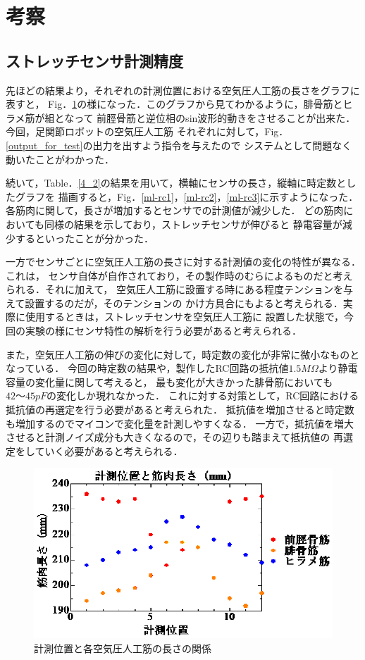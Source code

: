 \section{考察}
\subsection{ストレッチセンサ計測精度}
先ほどの結果より，それぞれの計測位置における空気圧人工筋の長さをグラフに表すと，
Fig．\ref{4-ml}の様になった．このグラフから見てわかるように，腓骨筋とヒラメ筋が組となって
前脛骨筋と逆位相のsin波形的動きをさせることが出来た．今回，足関節ロボットの空気圧人工筋
それぞれに対して，Fig．\ref{output_for_test}の出力を出すよう指令を与えたので
システムとして問題なく動いたことがわかった．

続いて，Table．\ref{4_2}の結果を用いて，横軸にセンサの長さ，縦軸に時定数としたグラフを
描画すると，Fig．\ref{ml-rc1}，\ref{ml-rc2}，\ref{ml-rc3}に示すようになった．
各筋肉に関して，長さが増加するとセンサでの計測値が減少した．
どの筋肉においても同様の結果を示しており，ストレッチセンサが伸びると
静電容量が減少するといったことが分かった．

一方でセンサごとに空気圧人工筋の長さに対する計測値の変化の特性が異なる．これは，
センサ自体が自作されており，その製作時のむらによるものだと考えられる．それに加えて，
空気圧人工筋に設置する時にある程度テンションを与えて設置するのだが，そのテンションの
かけ方具合にもよると考えられる．実際に使用するときは，ストレッチセンサを空気圧人工筋に
設置した状態で，今回の実験の様にセンサ特性の解析を行う必要があると考えられる．

また，空気圧人工筋の伸びの変化に対して，時定数の変化が非常に微小なものとなっている．
今回の時定数の結果や，製作したRC回路の抵抗値$1.5M\Omega$より静電容量の変化量に関して考えると，
最も変化が大きかった腓骨筋においても$42～45pF$の変化しか現れなかった．
これに対する対策として，RC回路における抵抗値の再選定を行う必要があると考えられた．
抵抗値を増加させると時定数も増加するのでマイコンで変化量を計測しやすくなる．
一方で，抵抗値を増大させると計測ノイズ成分も大きくなるので，その辺りも踏まえて抵抗値の
再選定をしていく必要があると考えられる．

\begin{figure}[h]
    \begin{center}
        \includegraphics[width=0.7\columnwidth,clip]{4_consideration/ml.eps}
    \end{center}
    \caption{計測位置と各空気圧人工筋の長さの関係}
    \label{4-ml}
\end{figure}

